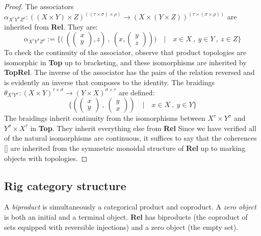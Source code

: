 \begin{proposition}
\begin{proof}
The associators $\alpha_{X^{\tau}Y^{\sigma}Z^{\rho}} : ((X \times Y) \times Z)^{((\tau \times \sigma) \times \rho)} \rightarrow (X \times (Y \times Z))^{(\tau \times (\sigma \times \rho))}$ are inherited from \textbf{Rel}. They are:
\[\alpha_{X^{\tau}Y^{\sigma}Z^{\rho}} := \{\big( \ (\begin{pmatrix} x \\ y \end{pmatrix} , z) \ , \ (x, \begin{pmatrix} y \\ z \end{pmatrix}) \big) \quad | \quad x \in X \ , \ y \in Y \ ,\ z \in Z \}\]
To check the continuity of the associator, observe that product topologies are isomorphic in \textbf{Top} up to bracketing, and these isomorphisms are inherited by \textbf{TopRel}. The inverse of the associator has the pairs of the relation reversed and is evidently an inverse that composes to the identity.
The braidings $\theta_{X^{\tau}Y^{\sigma}} : (X \times Y)^{\tau \times \sigma} \rightarrow (Y \times X)^{\sigma \times \tau}$ are defined:
\[\{(\begin{pmatrix} x \\ y \end{pmatrix} \ , \ \begin{pmatrix} y \\ x \end{pmatrix}) \quad | \quad x \in X \ , \ y \in Y  \}\]
The braidings inherit continuity from the isomorphisms between $X^\tau \times Y^\sigma$ and $Y^\sigma \times X^\tau$ in \textbf{Top}. They inherit everything else from \textbf{Rel}
Since we have verified all of the natural isomorphisms are continuous, it suffices to say that the coherences [] are inherited from the symmetric monoidal structure of \textbf{Rel} up to marking objects with topologies.
\end{proof}
\end{proposition}

\subsection{Rig category structure}

\begin{defn}
A \emph{biproduct} is simultaneously a categorical product and coproduct. A \emph{zero object} is both an initial and a terminal object. \textbf{Rel} has biproducts (the coproduct of sets equipped with reversible injections) and a zero object (the empty set).
\end{defn}

